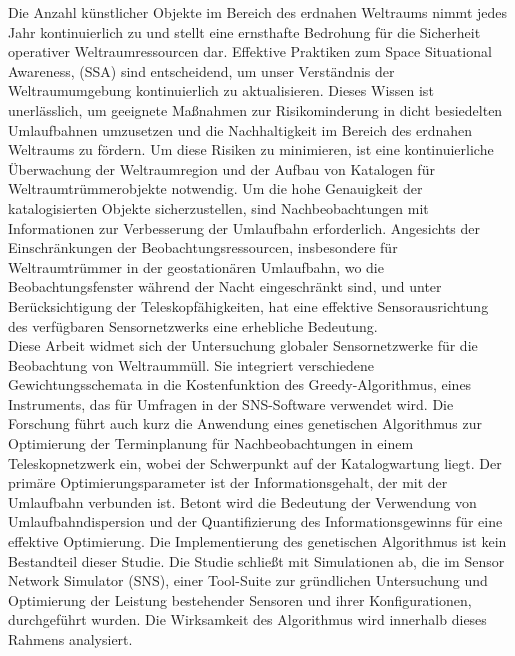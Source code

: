 Die Anzahl künstlicher Objekte im Bereich des erdnahen Weltraums nimmt jedes Jahr kontinuierlich zu und stellt eine ernsthafte Bedrohung für die Sicherheit operativer Weltraumressourcen dar. Effektive Praktiken zum Space Situational Awareness, (SSA) sind entscheidend, um unser Verständnis der Weltraumumgebung kontinuierlich zu aktualisieren. Dieses Wissen ist unerlässlich, um geeignete Maßnahmen zur Risikominderung in dicht besiedelten Umlaufbahnen umzusetzen und die Nachhaltigkeit im Bereich des erdnahen Weltraums zu fördern. Um diese Risiken zu minimieren, ist eine kontinuierliche Überwachung der Weltraumregion und der Aufbau von Katalogen für Weltraumtrümmerobjekte notwendig. Um die hohe Genauigkeit der katalogisierten Objekte sicherzustellen, sind Nachbeobachtungen mit Informationen zur Verbesserung der Umlaufbahn erforderlich. Angesichts der Einschränkungen der Beobachtungsressourcen, insbesondere für Weltraumtrümmer in der geostationären Umlaufbahn, wo die Beobachtungsfenster während der Nacht eingeschränkt sind, und unter Berücksichtigung der Teleskopfähigkeiten, hat eine effektive Sensorausrichtung des verfügbaren Sensornetzwerks eine erhebliche Bedeutung.\\

Diese Arbeit widmet sich der Untersuchung globaler Sensornetzwerke für die Beobachtung von Weltraummüll. Sie integriert verschiedene Gewichtungsschemata in die Kostenfunktion des Greedy-Algorithmus, eines Instruments, das für Umfragen in der SNS-Software verwendet wird. Die Forschung führt auch kurz die Anwendung eines genetischen Algorithmus zur Optimierung der Terminplanung für Nachbeobachtungen in einem Teleskopnetzwerk ein, wobei der Schwerpunkt auf der Katalogwartung liegt. Der primäre Optimierungsparameter ist der Informationsgehalt, der mit der Umlaufbahn verbunden ist. Betont wird die Bedeutung der Verwendung von Umlaufbahndispersion und der Quantifizierung des Informationsgewinns für eine effektive Optimierung. Die Implementierung des genetischen Algorithmus ist kein Bestandteil dieser Studie. Die Studie schließt mit Simulationen ab, die im Sensor Network Simulator (SNS), einer Tool-Suite zur gründlichen Untersuchung und Optimierung der Leistung bestehender Sensoren und ihrer Konfigurationen, durchgeführt wurden. Die Wirksamkeit des Algorithmus wird innerhalb dieses Rahmens analysiert.\\